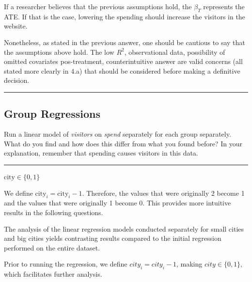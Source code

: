 \documentclass{article}
\newenvironment{colorparagraph}[1]{\par\color{#1}}{\par}
\begin{document}
If a researcher believes that the previous assumptions hold, the $\beta_T$ represents the ATE. If that is the case, lowering the spending should increase the visitors in the website.

Nonetheless, as stated in the previous answer, one should be cautious to say that the assumptions above hold. The low $R^2$, observational data, possibility of omitted covariates pos-treatment, counterintuitive answer are valid concerns (all stated more clearly in 4.a) that should be considered before making a definitive decision.

\begin{colorparagraph}{questioncolor}
\rule{\textwidth}{0.5pt}

\label{q4c}\subsection{Group Regressions}
Run a linear model of \textit{visitors} on \textit{spend} separately for each group separately. What
do you find and how does this differ from what you found before? In your explanation,
remember that spending causes visitors in this data.

\rule{\textwidth}{0.5pt}
\end{colorparagraph}

\textbf{$\text{city} \in \{0, 1\}$}

We define $\text{city}_i = \text{city}_i - 1$. Therefore, the values that were originally 2 become 1 and the values that were originally 1 become 0. This provides more intuitive results in the following questions.

The analysis of the linear regression models conducted separately for small cities and big cities yields contrasting results compared to the initial regression performed on the entire dataset.

Prior to running the regression, we define $city_i = city_i - 1$, making $city \in \{0, 1\}$, which facilitates further analysis.
\end{document}
